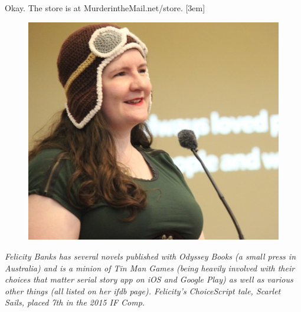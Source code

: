 \medskip
Okay. The store is at MurderintheMail.net/store.
\bigskip
{}[3em]
\begin{figure}
  \vspace{-2em}
  \begin{center}
  \includegraphics[width=\linewidth]{./media/images/felicity}%
  \label{fig:brian}%
  \end{center}
\end{figure}                                                                
\noindent\emph{Felicity Banks has several novels published with Odyssey Books (a small press in
Australia) and is a minion of Tin Man Games (being heavily involved with their
\emph{choices that matter} serial story app on iOS and Google Play) as well as
various other things (all listed on her ifdb page). Felicity's ChoiceScript tale, \emph{Scarlet Sails}, placed 7th in the 2015 IF Comp.}